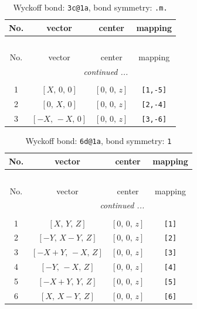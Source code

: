 \documentclass[fleqn,8pt]{jsarticle}
\begin{document}
\renewcommand{\arraystretch}{1.2}
\begin{longtable}{cccc}
\caption{Wyckoff bond: {\tt 3c@1a}, bond symmetry: {\tt .m.}}
 \\
 \hline \hline
No. & vector & center & mapping \\ \hline \endfirsthead

\multicolumn{3}{l}{\tablename\ \thetable{}} \\
 \hline \hline
No. & vector & center & mapping \\ \hline \endhead

 \hline \hline
\multicolumn{3}{r}{\footnotesize\it continued ...} \\ \endfoot

 \hline \hline
\multicolumn{3}{r}{} \\ \endlastfoot

1 & $\left[ X,\, 0,\, 0 \right]$ & $\left[ 0,\, 0,\, z \right]$ & {\tt [1,-5]} \\ \hline
2 & $\left[ 0,\, X,\, 0 \right]$ & $\left[ 0,\, 0,\, z \right]$ & {\tt [2,-4]} \\ \hline
3 & $\left[ - X,\, - X,\, 0 \right]$ & $\left[ 0,\, 0,\, z \right]$ & {\tt [3,-6]} \\
\end{longtable}
\renewcommand{\arraystretch}{1.2}
\begin{longtable}{cccc}
\caption{Wyckoff bond: {\tt 6d@1a}, bond symmetry: {\tt 1}}
 \\
 \hline \hline
No. & vector & center & mapping \\ \hline \endfirsthead

\multicolumn{3}{l}{\tablename\ \thetable{}} \\
 \hline \hline
No. & vector & center & mapping \\ \hline \endhead

 \hline \hline
\multicolumn{3}{r}{\footnotesize\it continued ...} \\ \endfoot

 \hline \hline
\multicolumn{3}{r}{} \\ \endlastfoot

1 & $\left[ X,\, Y,\, Z \right]$ & $\left[ 0,\, 0,\, z \right]$ & {\tt [1]} \\ \hline
2 & $\left[ - Y,\, X - Y,\, Z \right]$ & $\left[ 0,\, 0,\, z \right]$ & {\tt [2]} \\ \hline
3 & $\left[ - X + Y,\, - X,\, Z \right]$ & $\left[ 0,\, 0,\, z \right]$ & {\tt [3]} \\ \hline
4 & $\left[ - Y,\, - X,\, Z \right]$ & $\left[ 0,\, 0,\, z \right]$ & {\tt [4]} \\ \hline
5 & $\left[ - X + Y,\, Y,\, Z \right]$ & $\left[ 0,\, 0,\, z \right]$ & {\tt [5]} \\ \hline
6 & $\left[ X,\, X - Y,\, Z \right]$ & $\left[ 0,\, 0,\, z \right]$ & {\tt [6]} \\
\end{longtable}
\end{document}
